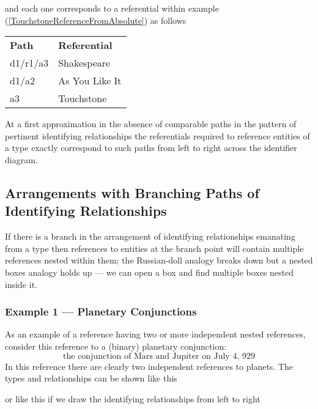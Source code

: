 and each one corresponds to a referential within example
(\ref{TouchstoneReferenceFromAbsolute}) as follows
\begin{tabular}{l l}
\textbf{Path}     & \textbf{Referential} \\
d1/r1/a3 & Shakespeare \\
d1/a2    & As You Like It\\
a3       & Touchstone
\end{tabular}

At a first approximation in the absence of comparable paths in the pattern of pertinent identifying relationships the referentials required to reference entities of a type exactly correspond to such paths from left to right across the identifier diagram.


\subsection{Arrangements with Branching Paths of Identifying Relationships}
If there is a branch in the arrangement of identifying relationships emanating from a type then references to entities at the branch point will contain multiple  references nested within them; 
the Russian-doll analogy breaks down but a nested boxes analogy holds up --- we can open a box and find multiple boxes nested inside it. 

\subsubsection{Example 1 --- Planetary Conjunctions}
As an example of a reference having two or more independent  nested references, consider this reference to  a (binary) planetary conjunction:
\begin{equation}
\mbox{the conjunction of Mars and Jupiter on July 4, 929}
\end{equation}
In this reference there are clearly two independent references to planets. 
The types and relationships can be shown like this

\begin{equation*}

\end{equation*}
or like this if we draw the identifying relationships from left to right

\begin{equation*}

\end{equation*}

